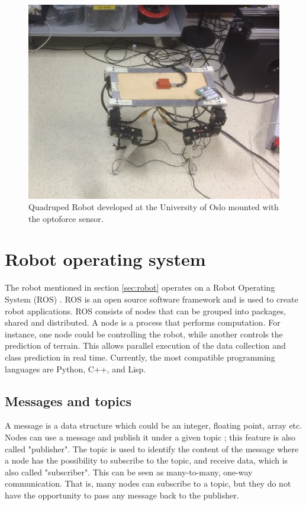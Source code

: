 \documentclass[USenglish]{ifimaster}  %
\begin{document}
\begin{figure}[h]
	\centering
	\includegraphics[width=\textwidth,height=\textheight,keepaspectratio]{Figures/Robot3}
	\caption[Quadruped robot developed at the University of Oslo]{Quadruped Robot developed at the University of Oslo mounted with the optoforce sensor.}
	\label{fig:robot}
\end{figure}
\FloatBarrier


\section{Robot operating system}
The robot mentioned in section \ref{sec:robot} operates on a Robot Operating System (ROS) \cite{ROSintro}. ROS is an open source software framework and is used to create robot applications. ROS consists of nodes that can be grouped into packages, shared and distributed. A node is a process that performs computation. For instance, one node could be controlling the robot, while another controls the prediction of terrain. This allows parallel execution of the data collection and class prediction in real time. Currently, the most compatible programming languages are Python, C++, and Lisp.

\subsection{Messages and topics}
A message is a data structure which could be an integer, floating point, array etc. Nodes can use a message and publish it under a given topic \cite{ROSconcept}; this feature is also called "publisher". The topic is used to identify the content of the message where a node has the possibility to subscribe to the topic, and receive data, which is also called "subscriber". This can be seen as many-to-many, one-way communication. That is, many nodes can subscribe to a topic, but they do not have the opportunity to pass any message back to the publisher.
\end{document}
